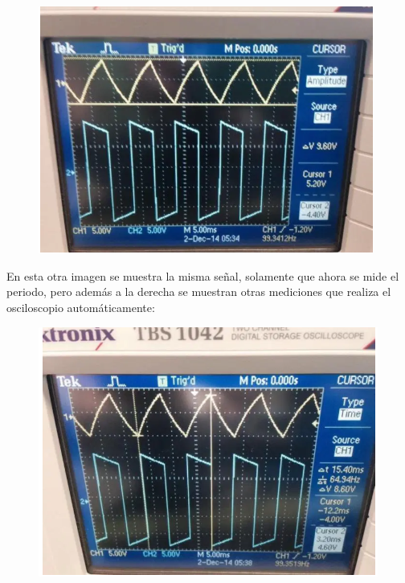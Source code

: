 \documentclass[12pt]{article}
\begin{document}

\begin{figure}[H]
	\begin{Center}
		\includegraphics[width=4.33in,height=3.2in]{./media/image15.png}
	\end{Center}
\end{figure}



\par


\vspace{\baselineskip}
\begin{Center}
En esta otra imagen se muestra la misma señal, solamente que ahora se mide el periodo, pero además a la derecha se muestran otras mediciones que realiza el osciloscopio automáticamente:
\end{Center}\par




\begin{figure}[H]
	\begin{Center}
		\includegraphics[width=4.4in,height=3.23in]{./media/image16.png}
	\end{Center}
\end{figure}
\end{document}
